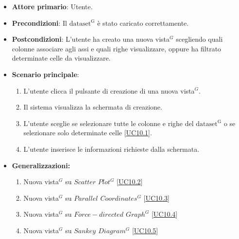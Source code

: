 \begin{itemize}
    \item \textbf{Attore primario}: Utente.
    \item \textbf{Precondizioni}: Il ${\mathrm{dataset^{G}}}$ è stato caricato correttamente.
    \item \textbf{Postcondizioni}: L'utente ha creato una nuova vista$^{G}$ scegliendo quali colonne associare agli assi e quali righe visualizzare, oppure ha filtrato determinate celle da visualizzare.
    \item \textbf{Scenario principale}:
          \begin{enumerate}
              \item L'utente clicca il pulsante di creazione di una nuova vista$^{G}$.
              \item Il sistema visualizza la schermata di creazione.
              \item L'utente sceglie se selezionare tutte le colonne e righe del ${\mathrm{dataset^{G}}}$ o se selezionare solo determinate celle [\hyperref[sec:UC10.1]{UC10.1}].
              \item L'utente inserisce le informazioni richieste dalla schermata.
          \end{enumerate}
  \item \textbf{Generalizzazioni:} \begin{enumerate}
                                        \item Nuova vista$^{G}$ su $Scatter$ $Plot^{G}$ [\hyperref[sec:UC10.2]{UC10.2}]
                                        \item Nuova vista$^{G}$ su \textit{$Parallel$ $Coordinates^{G}$} [\hyperref[sec:UC10.3]{UC10.3}]
                                        \item Nuova vista$^{G}$ su \textit{$Force-directed$ $Graph^{G}$} [\hyperref[sec:UC10.4]{UC10.4}]
                                        \item Nuova vista$^{G}$ su \textit{$Sankey$ $Diagram^{G}$} [\hyperref[sec:UC10.5]{UC10.5}]
                                    \end{enumerate}
\end{itemize}


